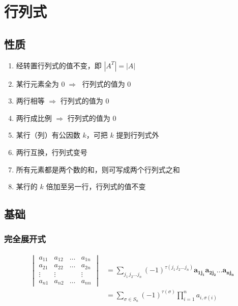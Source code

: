 \documentclass[a4paper,12pt]{article}
\begin{document}



    \section{行列式}

    \subsection{性质}

    \begin{enumerate}
        \item 经转置行列式的值不变，即 $|A^T| = |A|$
        \item 某行元素全为 $0 \;\Rightarrow\;$ 行列式的值为 0
        \item 两行相等 $\Rightarrow$ 行列式的值为 0
        \item 两行成比例 $\Rightarrow$ 行列式的值为 0
        \item 某行（列）有公因数 $k$，可把 $k$ 提到行列式外
        \item 两行互换，行列式变号
        \item {}所有元素都是两个数的和，则可写成两个行列式之和
        \item 某行的 $k$ 倍加至另一行，行列式的值不变
    \end{enumerate}

    \subsection{基础}

    \subsubsection{完全展开式}

    \begin{align*}
        \begin{vmatrix}
            a_{11} & a_{12} & \dots & a_{1n} \\
            a_{21} & a_{22} & \dots & a_{2n} \\
            \vdots & \vdots &       & \vdots \\
            a_{n1} & a_{n2} & \dots & a_{nn}
        \end{vmatrix}
        &= \sum_{j_1\,j_2\dots j_{n}} (-1)^{\tau(j_1\,j_2\dots j_n)} \mathbf{a_{1j_1}a_{2j_2}\dots a_{nj_n}} \\
        &= \sum_{\sigma \in S_n} (-1)^{\tau(\sigma)} \prod_{i=1}^{n} a_{i, \sigma(i)}
    \end{align*}
\end{document}

